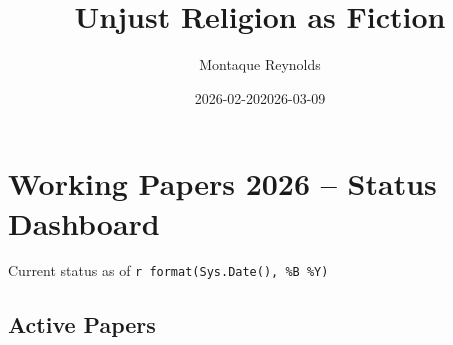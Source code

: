 \documentclass[
  letterpaper,
  DIV=11,
  numbers=noendperiod]{scrreprt}
\title{Unjust Religion as Fiction}
\author{Montaque Reynolds}
\date{2026-02-20}
\date{2026-03-09}
\renewcommand*\contentsname{Table of contents}
\newcommand\contentsname{Table of contents}
\begin{document}
\maketitle
\renewcommand*\contentsname{Table of contents}
{
\hypersetup{linkcolor=}
\setcounter{tocdepth}{2}
\tableofcontents
}

\chapter{Working Papers 2026 -- Status
Dashboard}\label{working-papers-2026-status-dashboard}

Current status as of
\texttt{r\ format(Sys.Date(),\ \textquotesingle{}\%B\ \%Y\textquotesingle{})}

\section{Active Papers}\label{active-papers}
\end{document}
